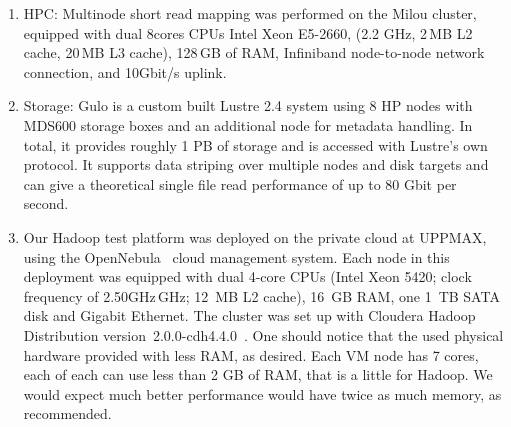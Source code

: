 \documentclass[11pt, oneside]{article}   	%
\begin{document}
\begin{enumerate}

\item 
HPC:
Multinode short read mapping was performed on the Milou cluster\cite{milouCluster}, equipped with dual 8cores CPUs Intel Xeon E5-2660, (2.2 GHz, 2\,MB L2 cache, 20\,MB L3 cache), 128\,GB of RAM, Infiniband node-to-node network connection, and 10Gbit/s uplink.

\item Storage: 
Gulo\cite{gulo} is a custom built Lustre 2.4 system using 8 HP nodes with MDS600 storage boxes and an additional node for metadata handling. In total, it provides roughly 1 PB of storage and is accessed with Lustre's own protocol. It supports data striping over multiple nodes and disk targets and can give a theoretical single file read performance of up to 80 Gbit per second.

\item Our  Hadoop test platform was deployed on the private cloud at UPPMAX, using the OpenNebula~\cite{opennebula} cloud management system. Each node in this deployment was equipped with dual 4-core CPUs (Intel Xeon 5420; clock frequency of 2.50GHz\,GHz; 12~MB L2 cache), 16~GB RAM, one 1~TB SATA disk and Gigabit Ethernet. The cluster was set up with Cloudera Hadoop Distribution version~2.0.0-cdh4.4.0~\cite{cloudera}.
One should notice that the used physical hardware provided with less RAM, as desired. Each VM node has 7 cores, each of each can use less than 2 GB of RAM, that is a little for Hadoop. We would expect much better performance would have twice as much memory, as recommended.

\end{enumerate}



\end{document}
